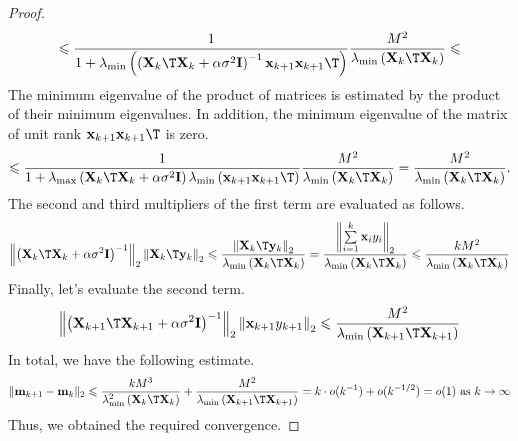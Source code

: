 \documentclass[sn-mathphys-num]{sn-jnl}%
\begin{document}
\begin{appendices}
\begin{proof}
    \[ \leqslant \dfrac{1}{1 + \lambda_{\min}\left(\left( \mathbf{X}_k\T \mathbf{X}_k + \alpha \sigma^2 \mathbf{I} \right)^{-1} \mathbf{x}_{k+1} \mathbf{x}_{k+1}\T \right)} \dfrac{M^2}{\lambda_{\min}\left( \mathbf{X}_k\T \mathbf{X}_k \right)} \leqslant \]
    The minimum eigenvalue of the product of matrices is estimated by the product of their minimum eigenvalues. In addition, the minimum eigenvalue of the matrix of unit rank $\mathbf{x}_{k+1}\mathbf{x}_{k+1}\T$ is zero.
    \[ \leqslant \dfrac{1}{1 + \lambda_{\max}\left( \mathbf{X}_k\T \mathbf{X}_k + \alpha \sigma^2 \mathbf{I} \right) \lambda_{\min}\left( \mathbf{x}_{k+1} \mathbf{x}_{k+1}\T \right)} \dfrac{M^2}{\lambda_{\min}\left( \mathbf{X}_k\T \mathbf{X}_k \right)} = \dfrac{M^2}{\lambda_{\min}\left( \mathbf{X}_k\T \mathbf{X}_k \right)}. \]
The second and third multipliers of the first term are evaluated as follows.
    \[ \left\| \left( \mathbf{X}_k\T \mathbf{X}_k + \alpha \sigma^2 \mathbf{I} \right)^{-1} \right\|_2 \left\| \mathbf{X}_k\T \mathbf{y}_k \right\|_2 \leqslant \dfrac{\left\| \mathbf{X}_k\T \mathbf{y}_k \right\|_2}{\lambda_{\min}\left( \mathbf{X}_k\T \mathbf{X}_k \right)} = \dfrac{\left\| \sum\limits_{i=1}^{k} \mathbf{x}_i y_i \right\|_2}{\lambda_{\min}\left( \mathbf{X}_k\T \mathbf{X}_k \right)} \leqslant \dfrac{k M^2}{\lambda_{\min}\left( \mathbf{X}_k\T \mathbf{X}_k \right)} \]
    Finally, let's evaluate the second term.
    \[ \left\| \left( \mathbf{X}_{k+1}\T \mathbf{X}_{k+1} + \alpha \sigma^2 \mathbf{I} \right)^{-1} \right\|_2 \left\| \mathbf{x}_{k+1} y_{k+1} \right\|_2 \leqslant \dfrac{M^2}{\lambda_{\min}\left( \mathbf{X}_{k+1}\T \mathbf{X}_{k+1} \right)} \]
    In total, we have the following estimate.
    \[ \| \mathbf{m}_{k+1} - \mathbf{m}_k \|_2 \leqslant \dfrac{k M^3}{\lambda_{\min}^2\left( \mathbf{X}_k\T \mathbf{X}_k \right)} + \dfrac{M^2}{\lambda_{\min}\left( \mathbf{X}_{k+1}\T \mathbf{X}_{k+1} \right)} = k\cdot o(k^{-1}) + o(k^{-1/2}) = o(1) \text{ as } k\to \infty\]
    Thus, we obtained the required convergence.
\end{proof}

\end{appendices}

\end{document}

